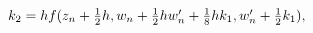 $k_{2}=hf(z_{n}+\tfrac{1}{2}h,w_{n}+\tfrac{1}{2}hw^{\prime}_{n}+\tfrac{1}{8}hk_%
{1},w^{\prime}_{n}+\tfrac{1}{2}k_{1}),$